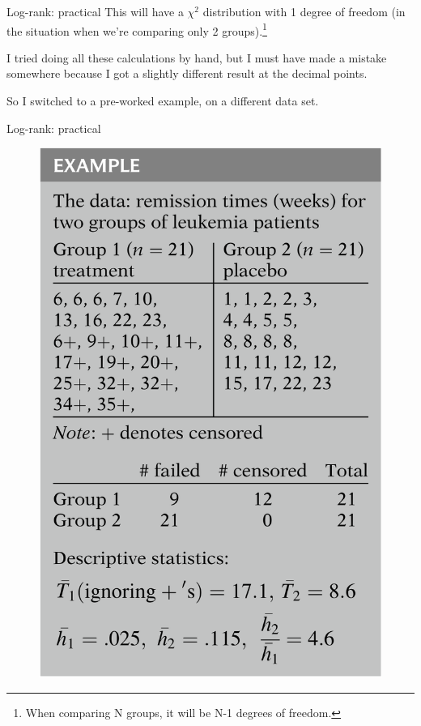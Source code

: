 \documentclass[12pt,english,pdf,xcolor=dvipsnames,aspectratio=169]{beamer}\usepackage[]{graphicx}\usepackage[]{xcolor}
\begin{document}
\begin{frame}{Log-rank: practical}
This will have a $\chi^2$ distribution with 1 degree of freedom (in the situation when we're comparing only 2 groups).\footnote{When comparing N groups, it will be N-1 degrees of freedom.}\bigskip

I tried doing all these calculations by hand, but I must have made a mistake somewhere because I got a slightly different result at the decimal points.\bigskip

So I switched to a pre-worked example, on a different data set.
\end{frame}



\begin{frame}{Log-rank: practical}

\begin{figure}
\centering
\includegraphics[height=0.8\textheight]{../03-graphs/01-08.png}

\end{figure}
\end{frame}
\end{document}
